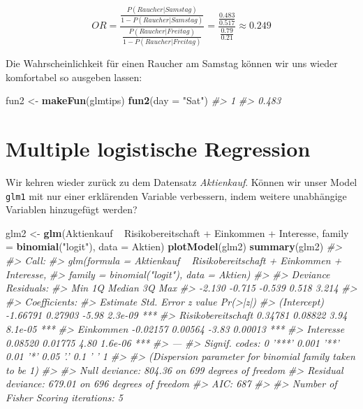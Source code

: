 \documentclass[12pt,]{book}
\newenvironment{Shaded}{\begin{snugshade}}{\end{snugshade}}
\newcommand{\KeywordTok}[1]{\textcolor[rgb]{0.13,0.29,0.53}{\textbf{{#1}}}}
\newcommand{\DataTypeTok}[1]{\textcolor[rgb]{0.13,0.29,0.53}{{#1}}}
\newcommand{\StringTok}[1]{\textcolor[rgb]{0.31,0.60,0.02}{{#1}}}
\newcommand{\CommentTok}[1]{\textcolor[rgb]{0.56,0.35,0.01}{\textit{{#1}}}}
\newcommand{\NormalTok}[1]{{#1}}
\begin{document}
\[{OR=\frac{\frac{P(Raucher|Samstag)}{1-P(Raucher|Samstag)}}
{\frac{P(Raucher|Freitag)}{1-P(Raucher|Freitag)}}
=\frac{\frac{0.483}{0.517}}
{\frac{0.79}{0.21}}
\approx 0.249}\]

Die Wahrscheinlichkeit für einen Raucher am Samstag können wir uns
wieder komfortabel so ausgeben lassen:

\begin{Shaded}
\begin{Highlighting}[]
\NormalTok{fun2 <-}\StringTok{ }\KeywordTok{makeFun}\NormalTok{(glmtips)}
\KeywordTok{fun2}\NormalTok{(}\DataTypeTok{day =} \StringTok{"Sat"}\NormalTok{)}
\CommentTok{#>     1 }
\CommentTok{#> 0.483}
\end{Highlighting}
\end{Shaded}

\section{Multiple logistische
Regression}\label{multiple-logistische-regression}

Wir kehren wieder zurück zu dem Datensatz \emph{Aktienkauf}. Können wir
unser Model \texttt{glm1} mit nur einer erklärenden Variable verbessern,
indem weitere unabhängige Variablen hinzugefügt werden?

\begin{Shaded}
\begin{Highlighting}[]
\NormalTok{glm2 <-}\StringTok{ }\KeywordTok{glm}\NormalTok{(Aktienkauf ~}\StringTok{ }\NormalTok{Risikobereitschaft +}\StringTok{ }\NormalTok{Einkommen +}\StringTok{ }\NormalTok{Interesse, }
            \DataTypeTok{family =} \KeywordTok{binomial}\NormalTok{(}\StringTok{"logit"}\NormalTok{), }\DataTypeTok{data =} \NormalTok{Aktien)}
\KeywordTok{plotModel}\NormalTok{(glm2)}
\KeywordTok{summary}\NormalTok{(glm2)}
\CommentTok{#> }
\CommentTok{#> Call:}
\CommentTok{#> glm(formula = Aktienkauf ~ Risikobereitschaft + Einkommen + Interesse, }
\CommentTok{#>     family = binomial("logit"), data = Aktien)}
\CommentTok{#> }
\CommentTok{#> Deviance Residuals: }
\CommentTok{#>    Min      1Q  Median      3Q     Max  }
\CommentTok{#> -2.130  -0.715  -0.539   0.518   3.214  }
\CommentTok{#> }
\CommentTok{#> Coefficients:}
\CommentTok{#>                    Estimate Std. Error z value Pr(>|z|)    }
\CommentTok{#> (Intercept)        -1.66791    0.27903   -5.98  2.3e-09 ***}
\CommentTok{#> Risikobereitschaft  0.34781    0.08822    3.94  8.1e-05 ***}
\CommentTok{#> Einkommen          -0.02157    0.00564   -3.83  0.00013 ***}
\CommentTok{#> Interesse           0.08520    0.01775    4.80  1.6e-06 ***}
\CommentTok{#> ---}
\CommentTok{#> Signif. codes:  0 '***' 0.001 '**' 0.01 '*' 0.05 '.' 0.1 ' ' 1}
\CommentTok{#> }
\CommentTok{#> (Dispersion parameter for binomial family taken to be 1)}
\CommentTok{#> }
\CommentTok{#>     Null deviance: 804.36  on 699  degrees of freedom}
\CommentTok{#> Residual deviance: 679.01  on 696  degrees of freedom}
\CommentTok{#> AIC: 687}
\CommentTok{#> }
\CommentTok{#> Number of Fisher Scoring iterations: 5}
\end{Highlighting}
\end{Shaded}
\end{document}
